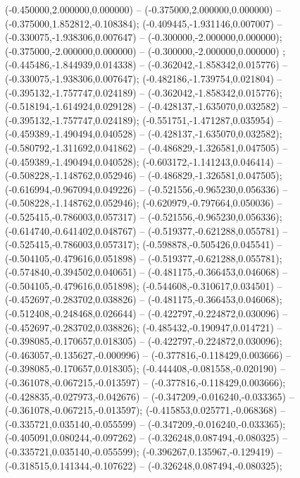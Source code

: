  (-0.450000,2.000000,0.000000) -- (-0.375000,2.000000,0.000000) -- (-0.375000,1.852812,-0.108384);
 (-0.409445,-1.931146,0.007007) -- (-0.330075,-1.938306,0.007647) -- (-0.300000,-2.000000,0.000000);
 (-0.375000,-2.000000,0.000000) -- (-0.300000,-2.000000,0.000000) ;
 (-0.445486,-1.844939,0.014338) -- (-0.362042,-1.858342,0.015776) -- (-0.330075,-1.938306,0.007647);
 (-0.482186,-1.739754,0.021804) -- (-0.395132,-1.757747,0.024189) -- (-0.362042,-1.858342,0.015776);
 (-0.518194,-1.614924,0.029128) -- (-0.428137,-1.635070,0.032582) -- (-0.395132,-1.757747,0.024189);
 (-0.551751,-1.471287,0.035954) -- (-0.459389,-1.490494,0.040528) -- (-0.428137,-1.635070,0.032582);
 (-0.580792,-1.311692,0.041862) -- (-0.486829,-1.326581,0.047505) -- (-0.459389,-1.490494,0.040528);
 (-0.603172,-1.141243,0.046414) -- (-0.508228,-1.148762,0.052946) -- (-0.486829,-1.326581,0.047505);
 (-0.616994,-0.967094,0.049226) -- (-0.521556,-0.965230,0.056336) -- (-0.508228,-1.148762,0.052946);
 (-0.620979,-0.797664,0.050036) -- (-0.525415,-0.786003,0.057317) -- (-0.521556,-0.965230,0.056336);
 (-0.614740,-0.641402,0.048767) -- (-0.519377,-0.621288,0.055781) -- (-0.525415,-0.786003,0.057317);
 (-0.598878,-0.505426,0.045541) -- (-0.504105,-0.479616,0.051898) -- (-0.519377,-0.621288,0.055781);
 (-0.574840,-0.394502,0.040651) -- (-0.481175,-0.366453,0.046068) -- (-0.504105,-0.479616,0.051898);
 (-0.544608,-0.310617,0.034501) -- (-0.452697,-0.283702,0.038826) -- (-0.481175,-0.366453,0.046068);
 (-0.512408,-0.248468,0.026644) -- (-0.422797,-0.224872,0.030096) -- (-0.452697,-0.283702,0.038826);
 (-0.485432,-0.190947,0.014721) -- (-0.398085,-0.170657,0.018305) -- (-0.422797,-0.224872,0.030096);
 (-0.463057,-0.135627,-0.000996) -- (-0.377816,-0.118429,0.003666) -- (-0.398085,-0.170657,0.018305);
 (-0.444408,-0.081558,-0.020190) -- (-0.361078,-0.067215,-0.013597) -- (-0.377816,-0.118429,0.003666);
 (-0.428835,-0.027973,-0.042676) -- (-0.347209,-0.016240,-0.033365) -- (-0.361078,-0.067215,-0.013597);
 (-0.415853,0.025771,-0.068368) -- (-0.335721,0.035140,-0.055599) -- (-0.347209,-0.016240,-0.033365);
 (-0.405091,0.080244,-0.097262) -- (-0.326248,0.087494,-0.080325) -- (-0.335721,0.035140,-0.055599);
 (-0.396267,0.135967,-0.129419) -- (-0.318515,0.141344,-0.107622) -- (-0.326248,0.087494,-0.080325);
